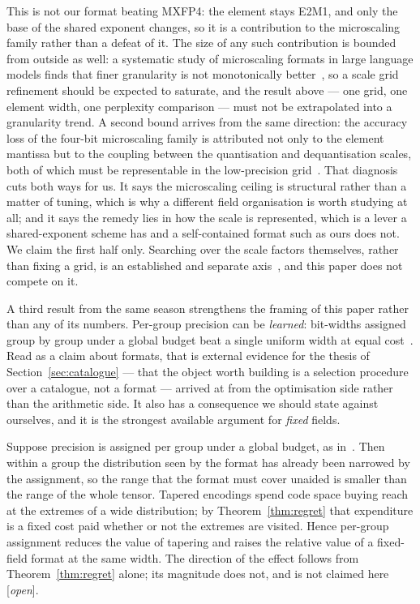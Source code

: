 This is not our format beating MXFP4: the element stays
E2M1, and only the base of the shared exponent changes, so it is a contribution
to the microscaling family rather than a defeat of it. The size of any such
contribution is bounded from outside as well: a systematic study of microscaling
formats in large language models finds that finer granularity is not monotonically
better~\cite{fasoli2026}, so a scale grid refinement should be expected to
saturate, and the result above --- one grid, one element width, one perplexity
comparison --- must not be extrapolated into a granularity trend. A second bound
arrives from the same direction: the accuracy loss of the four-bit microscaling
family is attributed not only to the element mantissa but to the coupling between
the quantisation and dequantisation scales, both of which must be representable in
the low-precision grid~\cite{yan2026focus}. That diagnosis cuts both ways for us.
It says the microscaling ceiling is structural rather than a matter of tuning,
which is why a different field organisation is worth studying at all; and it says
the remedy lies in how the scale is represented, which is a lever a shared-exponent
scheme has and a self-contained format such as ours does not. We claim the first
half only. Searching over
the scale factors themselves, rather than fixing a grid, is an established and
separate axis~\cite{gupta2026scalesearch}, and this paper does not compete on it.

A third result from the same season strengthens the framing of this paper rather
than any of its numbers. Per-group precision can be \emph{learned}: bit-widths
assigned group by group under a global budget beat a single uniform width at equal
cost~\cite{ogilvy2026variable}. Read as a claim about formats, that is external
evidence for the thesis of Section~\ref{sec:catalogue} --- that the object worth
building is a selection procedure over a catalogue, not a format --- arrived at from
the optimisation side rather than the arithmetic side. It also has a consequence we
should state against ourselves, and it is the strongest available argument for
\emph{fixed} fields.

\begin{corollary}
\label{cor:pergroup}
Suppose precision is assigned per group under a global budget, as
in~\cite{ogilvy2026variable}. Then within a group the distribution seen by the
format has already been narrowed by the assignment, so the range that the format
must cover unaided is smaller than the range of the whole tensor. Tapered encodings
spend code space buying reach at the extremes of a wide distribution; by
Theorem~\ref{thm:regret} that expenditure is a fixed cost paid whether or not the
extremes are visited. Hence per-group assignment reduces the value of tapering and
raises the relative value of a fixed-field format at the same width. The direction
of the effect follows from Theorem~\ref{thm:regret} alone; its magnitude does not,
and is not claimed here [\emph{open}].
\end{corollary}

